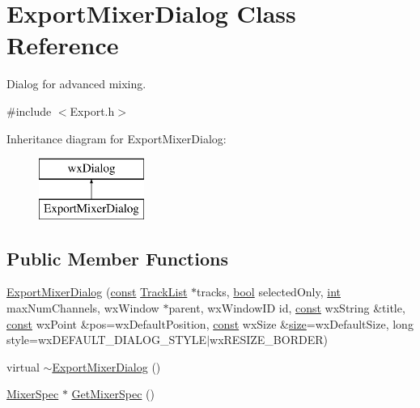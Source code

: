 \hypertarget{class_export_mixer_dialog}{}\section{Export\+Mixer\+Dialog Class Reference}
\label{class_export_mixer_dialog}


Dialog for advanced mixing.  




{\ttfamily \#include $<$Export.\+h$>$}

Inheritance diagram for Export\+Mixer\+Dialog\+:\begin{figure}[H]
\begin{center}
\leavevmode
\includegraphics[height=2.000000cm]{class_export_mixer_dialog}
\end{center}
\end{figure}
\subsection*{Public Member Functions}
\begin{DoxyCompactItemize}
\item 
\hyperlink{class_export_mixer_dialog_af60e94fe62802f4098ceb203a0dff08f}{Export\+Mixer\+Dialog} (\hyperlink{getopt1_8c_a2c212835823e3c54a8ab6d95c652660e}{const} \hyperlink{class_track_list}{Track\+List} $\ast$tracks, \hyperlink{mac_2config_2i386_2lib-src_2libsoxr_2soxr-config_8h_abb452686968e48b67397da5f97445f5b}{bool} selected\+Only, \hyperlink{xmltok_8h_a5a0d4a5641ce434f1d23533f2b2e6653}{int} max\+Num\+Channels, wx\+Window $\ast$parent, wx\+Window\+ID id, \hyperlink{getopt1_8c_a2c212835823e3c54a8ab6d95c652660e}{const} wx\+String \&title, \hyperlink{getopt1_8c_a2c212835823e3c54a8ab6d95c652660e}{const} wx\+Point \&pos=wx\+Default\+Position, \hyperlink{getopt1_8c_a2c212835823e3c54a8ab6d95c652660e}{const} wx\+Size \&\hyperlink{group__lavu__mem_ga854352f53b148adc24983a58a1866d66}{size}=wx\+Default\+Size, long style=wx\+D\+E\+F\+A\+U\+L\+T\+\_\+\+D\+I\+A\+L\+O\+G\+\_\+\+S\+T\+Y\+LE$\vert$wx\+R\+E\+S\+I\+Z\+E\+\_\+\+B\+O\+R\+D\+ER)
\item 
virtual \hyperlink{class_export_mixer_dialog_a7a606bcca1edfc96b1a07a802c43db9c}{$\sim$\+Export\+Mixer\+Dialog} ()
\item 
\hyperlink{class_mixer_spec}{Mixer\+Spec} $\ast$ \hyperlink{class_export_mixer_dialog_ad11b3732bfaaa6882a77e4a1793d8fca}{Get\+Mixer\+Spec} ()
\end{DoxyCompactItemize}


